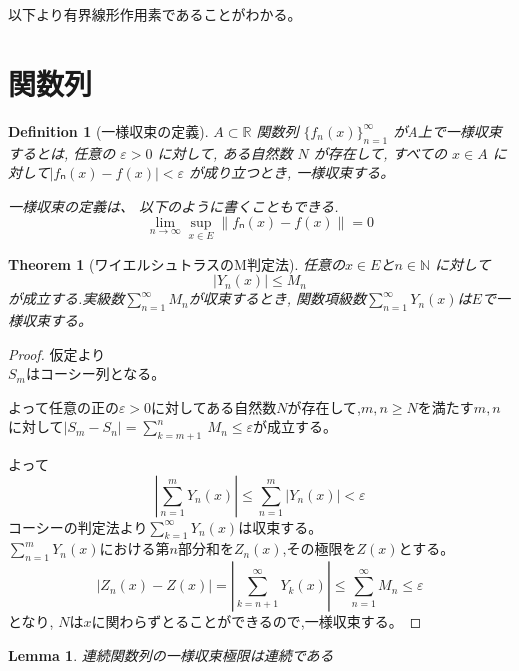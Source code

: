 \documentclass[a4paper]{article}
\newtheorem{Lemma}{Lemma}       %
\newtheorem{Definition}{Definition}   %
\newtheorem{Theorem}{Theorem}   %
\begin{document}
以下より有界線形作用素であることがわかる。

\section{関数列}
\label{sec:関数列}
\begin{Definition}[一様収束の定義]
    $A \subset \mathbb{R}$
    関数列 \(\{f_n(x)\}_{n=1}^\infty\) がA上で一様収束するとは, 任意の \(\varepsilon > 0\) に対して, ある自然数 \(N\) が存在して, すべての \(x \in A\) に対して$|fₙ(x) - f(x)| < \varepsilon$ が成り立つとき, 一様収束する。

    一様収束の定義は、 以下のように書くこともできる.
    \[
    \lim_{n \to \infty} \sup_{x \in E} \|fₙ(x) - f(x)\| = 0
    \]
\end{Definition}
\begin{Theorem}[ワイエルシュトラスのM判定法]
    任意の$x \in E$と$n \in \mathbb{N}$ に対して\[\left|Y_{n}(x)\right| \leq M_{n}\]が成立する.実級数$\displaystyle\sum_{n=1}^\infty M_{n} $が収束するとき, 関数項級数$\displaystyle\sum_{n=1}^\infty Y_{n}(x)$は$E$で一様収束する。
\end{Theorem}

\begin{proof}

    仮定より\\$S_{m}$はコーシー列となる。

    よって任意の正の$\varepsilon >0$に対してある自然数$N$が存在して,$m,n \geq N$を満たす$m,n$に対して$\left|S_{m}-S_{n}\right|= \displaystyle\sum_{k=m+1}^{n}\ M_{n} \leq \varepsilon $が成立する。

    よって
    \[\left|\displaystyle\sum_{n=1}^m Y_{n}(x)\right| \leq \sum_{n=1}^{m} \left|Y_{n}(x)\right| < \varepsilon\]
    コーシーの判定法より$\displaystyle\sum_{k=1}^\infty Y_{n}(x)$は収束する。\\
    $\displaystyle\sum_{n=1}^m Y_{n}(x)$における第$n$部分和を$Z_{n}(x)$,その極限を$Z(x)$とする。\\
    \[\left|Z_{n}(x)-Z(x)\right|=\left|\displaystyle\sum_{k=n+1}^\infty Y_{k}(x)\right| \leq \displaystyle\sum_{n=1}^\infty M_{n} \leq \varepsilon\]
    となり, $N$は$x$に関わらずとることができるので,一様収束する。
\end{proof}

\begin{Lemma}
    連続関数列の一様収束極限は連続である
\end{Lemma}
\end{document}
